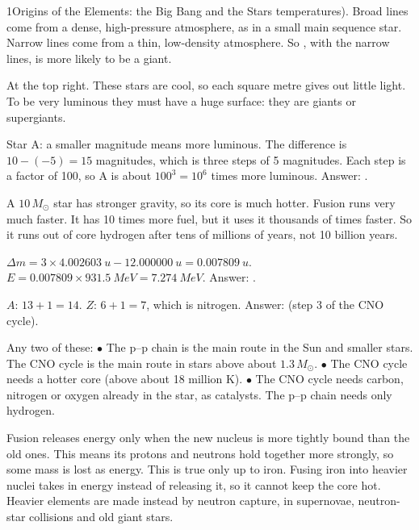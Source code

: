 \begin{chapteranswers}{1}{Origins of the Elements: the Big Bang and the Stars}
        temperatures). Broad lines come from a dense, high-pressure atmosphere, as in a
        small main sequence star. Narrow lines come from a thin, low-density atmosphere.
        So , with the narrow lines, is more likely to be a giant.
  \item At the top right. These stars are cool, so each square metre gives out
        little light. To be very luminous they must have a huge surface: they are
        giants or supergiants.
  \item Star A: a smaller magnitude means more luminous. The difference is
        $10 - (-5) = 15$ magnitudes, which is three steps of 5 magnitudes. Each step
        is a factor of 100, so A is about $100^3 = 10^6$ times more luminous.
        Answer: .
  \item A $10\,M_\odot$ star has stronger gravity, so its core is much hotter.
        Fusion runs very much faster. It has 10 times more fuel, but it uses it
        thousands of times faster. So it runs out of core hydrogen after tens of
        millions of years, not 10 billion years.
  \item $\Delta m = 3 \times \qty{4.002603}{u} - \qty{12.000000}{u} = \qty{0.007809}{u}$.
        $E = \num{0.007809} \times \qty{931.5}{MeV} = \qty{7.274}{MeV}$.
        Answer: .
  \item $A$: $13 + 1 = 14$. $Z$: $6 + 1 = 7$, which is nitrogen. Answer:
         (step 3 of the CNO cycle).
  \item Any two of these:\newline
        $\bullet$ The p--p chain is the main route in the Sun and smaller stars. The CNO
        cycle is the main route in stars above about $1.3\,M_\odot$.\newline
        $\bullet$ The CNO cycle needs a hotter core (above about 18 million K).\newline
        $\bullet$ The CNO cycle needs carbon, nitrogen or oxygen already in the star, as
        catalysts. The p--p chain needs only hydrogen.
  \item Fusion releases energy only when the new nucleus is more tightly bound than the
        old ones. This means its protons and neutrons hold together more strongly, so
        some mass is lost as energy. This is true only up to iron. Fusing iron into heavier nuclei takes
        in energy instead of releasing it, so it cannot keep the core hot. Heavier
        elements are made instead by neutron capture, in supernovae, neutron-star
        collisions and old giant stars.
\end{chapteranswers}

